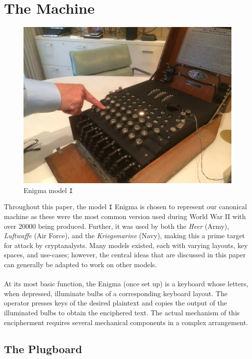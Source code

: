 \section{The Machine}
\begin{figure}[H]
  \begin{center}\includegraphics[scale=0.3]{paper/images/enigma.jpg}
  \end{center}
  \label{ref:enigma}
  \caption{Enigma model \texttt{I}}
\end{figure}
Throughout this paper, the model \texttt{I} Enigma is chosen to
represent our canonical machine as these were the most common version
used during World War II with over 20000 being produced. Further, it
was used by both the \emph{Heer} (Army), \emph{Luftwaffe} (Air
Force), and the \emph{Kriegsmarine} (Navy), making this a prime target
for attack by cryptanalysts. Many models existed, each with varying
layouts, key spaces, and use-cases; however, the central ideas that
are discussed in this paper can generally be adapted to work on other models.
\\\\At its most basic function, the Enigma (once set up) is a
keyboard whose letters, when depressed, illuminate bulbs of a
corresponding keyboard layout. The operator presses keys of the
desired plaintext and copies the output of the illuminated bulbs to
obtain the enciphered text. The actual mechanism of this encipherment
requires several mechanical components in a complex arrangement.

\subsection{The Plugboard}

